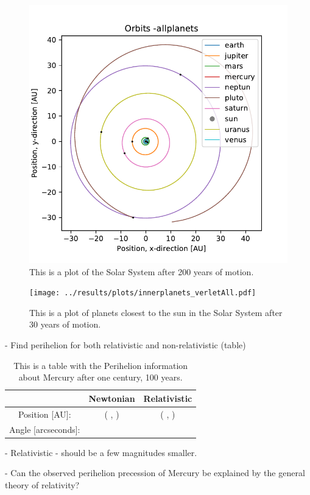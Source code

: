 \begin{figure}[H]
\includegraphics[width=1.1\linewidth]{../results/plots/plotof-earthjupiter-allplanets.pdf}\caption{This is a plot of the Solar System after 200 years of motion.}\label{fig:solarsystem_allplanets}
\end{figure}

\begin{figure}[H]
\texttt{[image: ../results/plots/innerplanets\_verletAll.pdf]}\caption{This is a plot of planets closest to the sun in the Solar System after 30 years of motion.}\label{fig:solarsystem_innerplanets}
\end{figure}
	
	- Find perihelion for both relativistic and non-relativistic (table)
	
\begin{table}\caption{This is a table with the Perihelion information about Mercury after one century, 100 years.}\label{tab:Perihelion}
\begin{tabular}{ccc}
 & Newtonian & Relativistic\\ \hline
Position [AU]: & ( , ) & ( , )\\
Angle [arcseconds]: & & \\
\end{tabular}
\end{table}

	- Relativistic - should be a few magnitudes smaller.	

	-  Can the observed perihelion
precession of Mercury be explained by the general theory of relativity?
